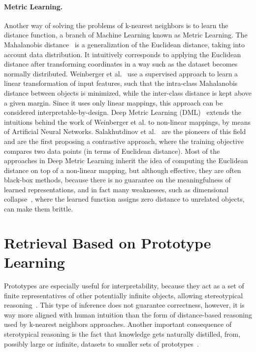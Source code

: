 \paragraph{Metric Learning.} Another way of solving the problems of k-nearest neighbors is to learn the distance function, a branch of Machine Learning known as Metric Learning. 
The Mahalanobis distance~\cite{mahalanobis1936mahalanobis} is a generalization of the Euclidean distance, taking into account data distribution. It intuitively corresponds to applying the Euclidean distance after transforming coordinates in a way such as the dataset becomes normally distributed.
Weinberger et al.~\cite{weinberger2009distance} use a supervised approach to learn a linear transformation of input features, such that the intra-class Mahalanobis distance between objects is minimized, while the inter-class distance is kept above a given margin. Since it uses only linear mappings, this approach can be considered interpretable-by-design.
%
 Deep Metric Learning (DML)~\cite{kaya2019deep} extends the intuitions behind the work of Weinberger et al. to non-linear mappings, by means of Artificial Neural Networks. Salakhutdinov et al.~\cite{salakhutdinov2007learning} are the pioneers of this field and are the first proposing a contrastive approach, where the training objective compares two data points (in terms of Euclidean distance).
 Most of the approaches in Deep Metric Learning inherit the idea of computing the Euclidean distance on top of a non-linear mapping, but although effective, they are often black-box methods, because there is no guarantee on the meaningfulness of learned representations, and in fact many weaknesses, such as dimensional collapse~\cite{jing2021understanding}, where the learned function assigns zero distance to unrelated objects, can make them brittle.

\section{Retrieval Based on Prototype Learning}
Prototypes are especially useful for interpretability, because they act as a set of finite representatives of other potentially infinite objects, allowing stereotypical reasoning~\cite{lehmann1998stereotypical}. This type of inference does not guarantee correctness, however, it is way more aligned with human intuition than the form of distance-based reasoning used by k-nearest neighbors approaches.
Another important consequence of sterotypical reasoning is the fact that knowledge gets naturally distilled, from, possibly large or infinite, datasets to smaller sets of prototypes~\cite{bien2011prototype}.

